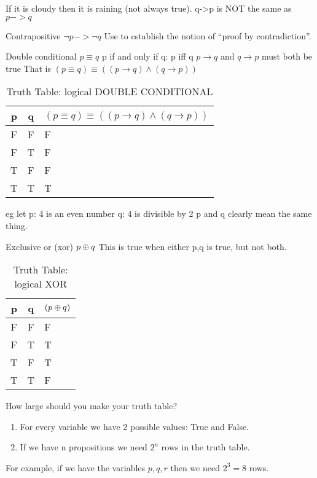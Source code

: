 If it is cloudy then it is raining (not always true).
q->p is NOT the same as $p -> q$

Contrapositive $\lnot p -> \lnot q$
Use to establish the notion of ``proof by contradiction''.

Double conditional $ p \equiv q $
p if and only if q: p iff q
$p \to q$ and $q \to p$ must both be true
That is $(p \equiv q) \equiv (( p \to q) \land (q \to p))$

\begin{table}[!htb]
\label{tab:TruthTableEQUIVALENCE}
\begin{tabularx}{\linewidth}{| c | c | X |} \hline
  p & q & $( p \equiv q ) \equiv (( p \to q) \land (q \to p))$
                                                    \\ \hline \hline
  F & F & F \\ \hline
  F & T & F \\ \hline
  T & F & F \\ \hline
  T & T & T \\ \hline
\end{tabularx}
\caption{Truth Table: logical DOUBLE CONDITIONAL}
\end{table}

eg let p: 4 is an even number
       q: 4 is divisible by 2
       p and q clearly mean the same thing.
       
Exclusive or (xor) $p \oplus q$
This is true when either p,q is true, but not both.

\begin{table}[!htb]
\label{tab:TruthTableXOR}
\begin{tabularx}{\linewidth}{| c | c | X |} \hline
  p & q & $( p \oplus q )$ \\ \hline \hline
  F & F & F \\ \hline
  F & T & T \\ \hline
  T & F & T \\ \hline
  T & T & F \\ \hline
\end{tabularx}
\caption{Truth Table: logical XOR}
\end{table}

How large should you make your truth table?
\begin{enumerate}
  \item For every variable we have 2 possible values: True and False.
  \item If we have n propositions we need ${2}^{n}$ rows in the truth table.
\end{enumerate}
For example, if we have the variables $p,q,r$ then we need ${2}^{3} = 8$ rows.

